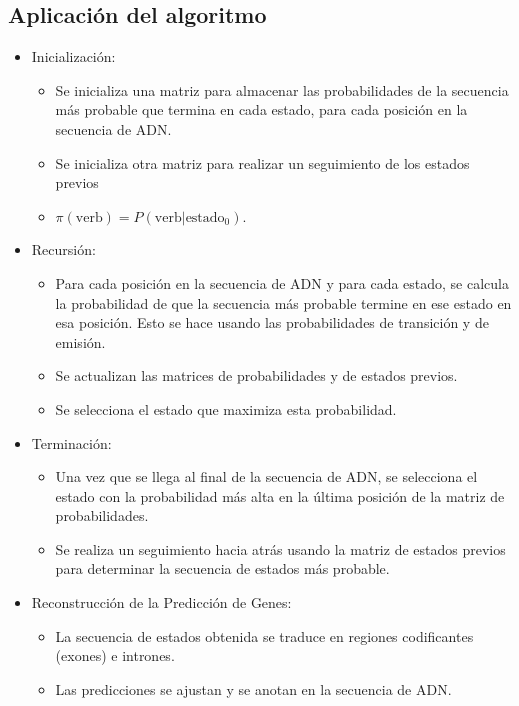 \documentclass[11pt,openany]{book}
\begin{document}
\subsection*{Aplicación del algoritmo}
\begin{itemize}
      \item Inicialización:
      \begin{itemize}
            \item Se inicializa una matriz para almacenar las probabilidades de la secuencia más probable que termina en cada estado, para cada posición en la secuencia de ADN.
            \item Se inicializa otra matriz para realizar un seguimiento de los estados previos
            \item $\pi(\text{verb}) = P(\text{verb} | \text{estado}_0)$.
      \end{itemize}
      \item Recursión:
      \begin{itemize}
            \item Para cada posición en la secuencia de ADN y para cada estado, se calcula la probabilidad de que la secuencia más probable termine en ese estado en esa posición. Esto se hace usando las probabilidades de transición y de emisión.
            \item Se actualizan las matrices de probabilidades y de estados previos.
            \item Se selecciona el estado que maximiza esta probabilidad.
      \end{itemize}
      \item Terminación:
      \begin{itemize}
            \item Una vez que se llega al final de la secuencia de ADN, se selecciona el estado con la probabilidad más alta en la última posición de la matriz de probabilidades.
            \item Se realiza un seguimiento hacia atrás usando la matriz de estados previos para determinar la secuencia de estados más probable.
      \end{itemize}
      \item Reconstrucción de la  Predicción de Genes:
      \begin{itemize}
            \item La secuencia de estados obtenida se traduce en regiones codificantes (exones) e intrones.
            \item Las predicciones se ajustan y se anotan en la secuencia de ADN.

      \end{itemize}
\end{itemize}
\end{document}
